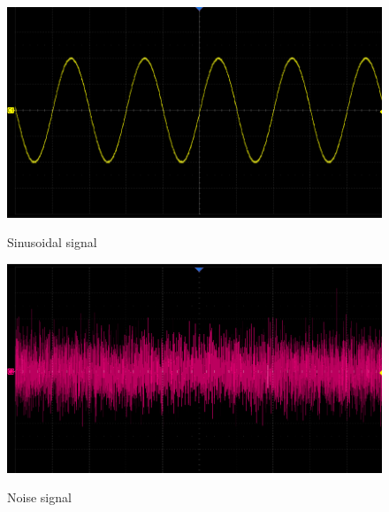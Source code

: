 \documentclass[a4paper,12pt]{article}
\begin{document}
\begin{figure}[H]
    \centering
    \begin{minipage}[b]{0.40\linewidth} %
        \centering
        \label{fig:sin}
        \includegraphics[width=\linewidth]{sin.png}
        \caption{Sinusoidal signal}
    \end{minipage}
    \hspace{0.05\linewidth} %
    \begin{minipage}[b]{0.40\linewidth} %
        \centering
        \label{fig:noise}
        \includegraphics[width=\linewidth]{noise.png}
        \caption{Noise signal}
    \end{minipage}
    

\end{figure}
\end{document}
